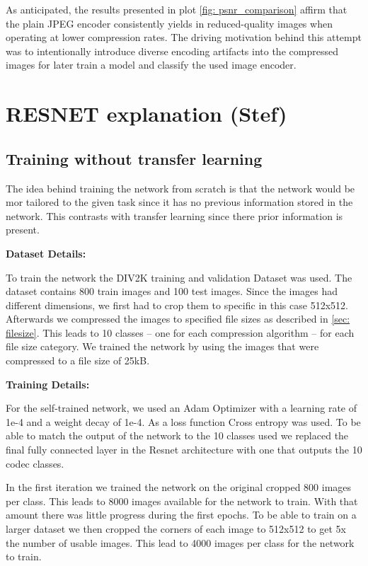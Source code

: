 \documentclass{article}
\begin{document}
\noindent
As anticipated, the results presented in plot \ref{fig: psnr_comparison} affirm that the plain JPEG encoder consistently yields in reduced-quality images when operating at lower compression rates.
The driving motivation behind this attempt was to intentionally introduce diverse encoding artifacts into the compressed images for later train a model and classify the used image encoder.
\newpage

\section{RESNET explanation (Stef)}

\subsection{Training without transfer learning}

The idea behind training the network from scratch is that the network would be mor tailored to the given task since it has no previous information stored in the network. This contrasts with transfer learning since there prior information is present.
\newline

\noindent
\textbf{Dataset Details:}

\noindent
To train the network the DIV2K training and validation Dataset was used. The dataset contains 800 train images and 100 test images. Since the images had different dimensions, we first had to crop them to specific in this case 512x512. Afterwards we compressed the images to specified file sizes as described in \ref{sec: filesize}. This leads to 10 classes – one for each compression algorithm – for each file size category. We trained the network by using the images that were compressed to a file size of 25kB.
\newline

\noindent
\textbf{Training Details:}

\noindent
For the self-trained network, we used an Adam Optimizer with a learning rate of 1e-4 and a weight decay of 1e-4. As a loss function Cross entropy was used. To be able to match the output of the network to the 10 classes used we replaced the final fully connected layer in the Resnet architecture with one that outputs the 10 codec classes.

\noindent
In the first iteration we trained the network on the original cropped 800 images per class. This leads to 8000 images available for the network to train. With that amount there was little progress during the first epochs. To be able to train on a larger dataset we then cropped the corners of each image to 512x512 to get 5x the number of usable images. This lead to 4000 images per class for the network to train.
\end{document}
